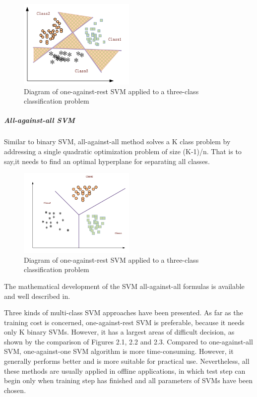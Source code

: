 \documentclass[]{article}
\begin{document}
\begin{figure}[h!]
	\centering
	\includegraphics[width=0.5\textwidth]{one_against_rest.png}
	\caption{Diagram of one-against-rest SVM applied to a three-class classification problem}
\end{figure} 

\subparagraph{All-against-all SVM}
Similar to binary SVM, all-against-all method solves a
K class problem by addressing a single quadratic optimization problem of size
(K-1)/n. That is to say,it needs to find an optimal hyperplane for separating all classes\cite{hsu2002comparison}.

\begin{figure}[h!]
	\centering
	\includegraphics[width=0.5\textwidth]{all_against_all.png}
	\caption{Diagram of one-against-rest SVM applied to a three-class classification problem}
\end{figure} 

The mathematical development of the SVM all-against-all formulas is available and well described in\cite{bredensteiner1999multicategory}.

Three kinds of multi-class SVM approaches have been presented.  As far as the
training cost is concerned, one-against-rest SVM is preferable, because it needs
only K binary  SVMs.   However,  it  has  a  largest  areas  of  difficult  decision,  as shown by the comparison of Figures 2.1, 2.2 and 2.3.  Compared to one-against-all  SVM,  one-against-one  SVM  algorithm  is  more time-consuming. However, it generally performs better and is more suitable for practical use. Nevertheless, all these methods are usually applied in offline applications, in which test step can begin only when training step has
finished and all parameters of SVMs have been chosen\cite{lu2014online}.
\end{document}
